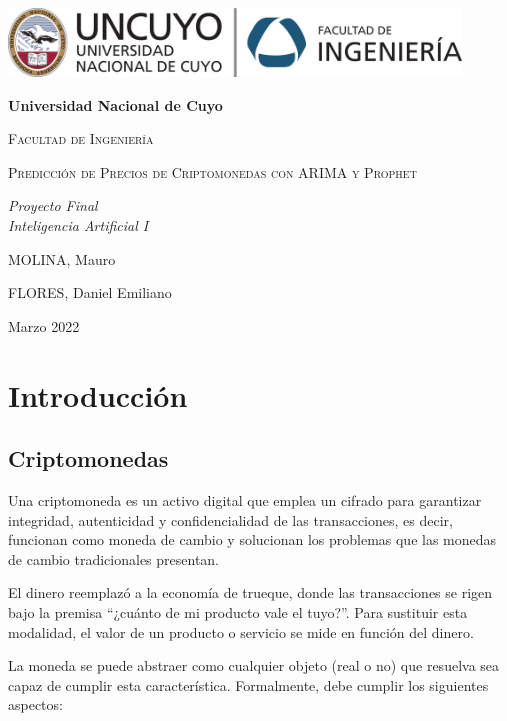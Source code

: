 \documentclass[a4paper,10pt]{article}
\begin{document}
\begin{titlepage}
\centering
{\includegraphics[width=0.9\textwidth]{fing_uncuyo}\par}
\vspace{1cm}
{\bfseries\LARGE Universidad Nacional de Cuyo \par}
\vspace{1cm}
{\scshape\Large Facultad de Ingeniería \par}
\vspace{3cm}
{\scshape\Huge Predicción de Precios de Criptomonedas con ARIMA y Prophet \par}
\vspace{3cm}
{\itshape\Large Proyecto Final\\Inteligencia Artificial I \par}
\vfill
{\Large MOLINA, Mauro \par}
{\Large FLORES, Daniel Emiliano \par}
\vfill
{\Large Marzo 2022 \par}
\end{titlepage}

\newpage

\tableofcontents

\newpage

\section{Introducción}

\subsection{Criptomonedas}

 Una criptomoneda es un activo digital que emplea un cifrado para garantizar integridad, autenticidad y confidencialidad de las transacciones, es decir, funcionan como moneda de cambio y solucionan los problemas que las monedas de cambio tradicionales presentan.

 El dinero reemplazó a la economía de trueque, donde las transacciones se rigen bajo la premisa ``¿cuánto de mi producto vale el tuyo?''. Para sustituir esta modalidad, el valor de un producto o servicio se mide en función del dinero.

La moneda se puede abstraer como cualquier objeto (real o no) que resuelva sea capaz de cumplir esta característica. Formalmente, debe cumplir los siguientes aspectos:
\end{document}
